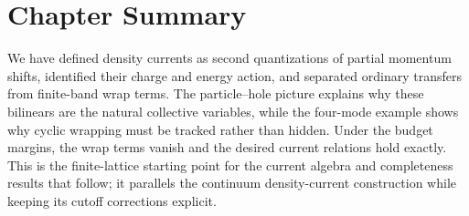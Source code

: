 \section{Chapter Summary}
We have defined density currents as second quantizations of partial
momentum shifts, identified their charge and energy action, and separated
ordinary transfers from finite-band wrap terms. The particle--hole picture
explains why these bilinears are the natural collective variables, while
the four-mode example shows why cyclic wrapping must be tracked rather than
hidden. Under the budget margins, the wrap terms vanish and the desired
current relations hold exactly. This is the finite-lattice starting point
for the current algebra and completeness results that follow; it parallels
the continuum density-current construction while keeping its cutoff
corrections explicit.
